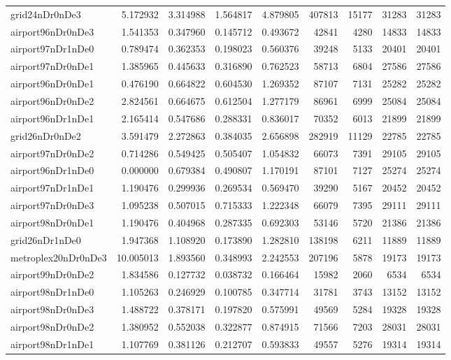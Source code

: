 \begin{longtable}{|l|r|r|r|r|r|r|r|r|}
grid24nDr0nDe3 & 5.172932 & 3.314988 & 1.564817 & 4.879805 & 407813 & 15177 & 31283 & 31283 \\
airport96nDr0nDe3 & 1.541353 & 0.347960 & 0.145712 & 0.493672 & 42841 & 4280 & 14833 & 14833 \\
airport97nDr1nDe0 & 0.789474 & 0.362353 & 0.198023 & 0.560376 & 39248 & 5133 & 20401 & 20401 \\
airport97nDr0nDe1 & 1.385965 & 0.445633 & 0.316890 & 0.762523 & 58713 & 6804 & 27586 & 27586 \\
airport96nDr0nDe1 & 0.476190 & 0.664822 & 0.604530 & 1.269352 & 87107 & 7131 & 25282 & 25282 \\
airport96nDr0nDe2 & 2.824561 & 0.664675 & 0.612504 & 1.277179 & 86961 & 6999 & 25084 & 25084 \\
airport96nDr1nDe1 & 2.165414 & 0.547686 & 0.288331 & 0.836017 & 70352 & 6013 & 21899 & 21899 \\
grid26nDr0nDe2 & 3.591479 & 2.272863 & 0.384035 & 2.656898 & 282919 & 11129 & 22785 & 22785 \\
airport97nDr0nDe2 & 0.714286 & 0.549425 & 0.505407 & 1.054832 & 66073 & 7391 & 29105 & 29105 \\
airport96nDr1nDe0 & 0.000000 & 0.679384 & 0.490807 & 1.170191 & 87101 & 7127 & 25274 & 25274 \\
airport97nDr1nDe1 & 1.190476 & 0.299936 & 0.269534 & 0.569470 & 39290 & 5167 & 20452 & 20452 \\
airport97nDr0nDe3 & 1.095238 & 0.507015 & 0.715333 & 1.222348 & 66079 & 7395 & 29111 & 29111 \\
airport98nDr0nDe1 & 1.190476 & 0.404968 & 0.287335 & 0.692303 & 53146 & 5720 & 21386 & 21386 \\
grid26nDr1nDe0 & 1.947368 & 1.108920 & 0.173890 & 1.282810 & 138198 & 6211 & 11889 & 11889 \\
metroplex20nDr0nDe3 & 10.005013 & 1.893560 & 0.348993 & 2.242553 & 207196 & 5878 & 19173 & 19173 \\
airport99nDr0nDe2 & 1.834586 & 0.127732 & 0.038732 & 0.166464 & 15982 & 2060 & 6534 & 6534 \\
airport98nDr1nDe0 & 1.105263 & 0.246929 & 0.100785 & 0.347714 & 31781 & 3743 & 13152 & 13152 \\
airport98nDr0nDe3 & 1.488722 & 0.378171 & 0.197820 & 0.575991 & 49569 & 5284 & 19328 & 19328 \\
airport98nDr0nDe2 & 1.380952 & 0.552038 & 0.322877 & 0.874915 & 71566 & 7203 & 28031 & 28031 \\
airport98nDr1nDe1 & 1.107769 & 0.381126 & 0.212707 & 0.593833 & 49557 & 5276 & 19314 & 19314 \\

\end{longtable}
